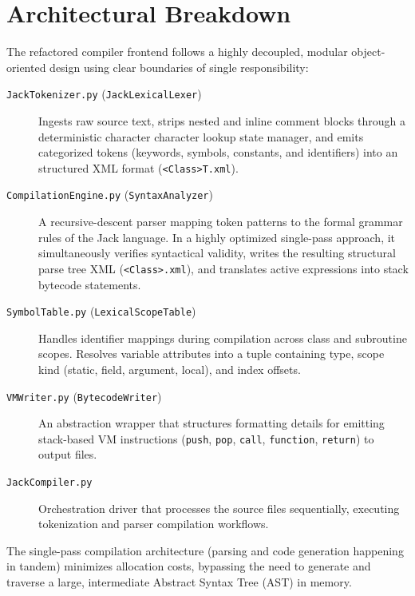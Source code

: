 \documentclass[11pt,a4paper]{article}
\begin{document}
\section{Architectural Breakdown}

The refactored compiler frontend follows a highly decoupled, modular object-oriented design using clear boundaries of single responsibility:

\begin{description}
    \item[\texttt{JackTokenizer.py} (\texttt{JackLexicalLexer})]
    Ingests raw source text, strips nested and inline comment blocks through a deterministic character character lookup state manager, and emits categorized tokens (keywords, symbols, constants, and identifiers) into an structured XML format (\texttt{<Class>T.xml}).
    
    \item[\texttt{CompilationEngine.py} (\texttt{SyntaxAnalyzer})]
    A recursive-descent parser mapping token patterns to the formal grammar rules of the Jack language. In a highly optimized single-pass approach, it simultaneously verifies syntactical validity, writes the resulting structural parse tree XML (\texttt{<Class>.xml}), and translates active expressions into stack bytecode statements.
    
    \item[\texttt{SymbolTable.py} (\texttt{LexicalScopeTable})]
    Handles identifier mappings during compilation across class and subroutine scopes. Resolves variable attributes into a tuple containing type, scope kind (static, field, argument, local), and index offsets.
    
    \item[\texttt{VMWriter.py} (\texttt{BytecodeWriter})]
    An abstraction wrapper that structures formatting details for emitting stack-based VM instructions (\texttt{push}, \texttt{pop}, \texttt{call}, \texttt{function}, \texttt{return}) to output files.
    
    \item[\texttt{JackCompiler.py}]
    Orchestration driver that processes the source files sequentially, executing tokenization and parser compilation workflows.
\end{description}

The single-pass compilation architecture (parsing and code generation happening in tandem) minimizes allocation costs, bypassing the need to generate and traverse a large, intermediate Abstract Syntax Tree (AST) in memory.
\end{document}
